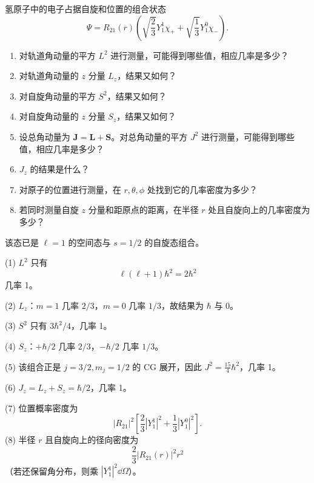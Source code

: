 \begin{question}
氢原子中的电子占据自旋和位置的组合状态
\[
\Psi=R_{21}(r)\left(\sqrt{\frac23}Y_1^1\chi_+ +\sqrt{\frac13}Y_1^0\chi_-\right).
\]
\begin{enumerate}
\item 对轨道角动量的平方 $L^2$ 进行测量，可能得到哪些值，相应几率是多少？
\item 对轨道角动量的 $z$ 分量 $L_z$，结果又如何？
\item 对自旋角动量的平方 $S^2$，结果又如何？
\item 对自旋角动量的 $z$ 分量 $S_z$，结果又如何？
\item 设总角动量为 $\mathbf J=\mathbf L+\mathbf S$。对总角动量的平方 $J^2$ 进行测量，可能得到哪些值，相应几率是多少？
\item $J_z$ 的结果是什么？
\item 对原子的位置进行测量，在 $r,\theta,\phi$ 处找到它的几率密度为多少？
\item 若同时测量自旋 $z$ 分量和距原点的距离，在半径 $r$ 处且自旋向上的几率密度为多少？
\end{enumerate}
\end{question}
\begin{solution}

该态已是 $\ell=1$ 的空间态与 $s=1/2$ 的自旋态组合。

(1) $L^2$ 只有
\[
\ell(\ell+1)
\hbar^2=2\hbar^2
\]
几率 1。

(2) $L_z$：$m=1$ 几率 $2/3$，$m=0$ 几率 $1/3$，故结果为 $\hbar$ 与 $0$。

(3) $S^2$ 只有 $3\hbar^2/4$，几率 1。

(4) $S_z$：$+\hbar/2$ 几率 $2/3$，$-\hbar/2$ 几率 $1/3$。

(5) 该组合正是 $j=3/2,m_j=1/2$ 的 CG 展开，因此 $J^2=\frac{15}{4}\hbar^2$，几率 1。

(6) $J_z=L_z+S_z=\hbar/2$，几率 1。

(7) 位置概率密度为
\[
|R_{21}|^2\left[\frac23|Y_1^1|^2+\frac13|Y_1^0|^2\right].
\]
(8) 半径 $r$ 且自旋向上的径向密度为
\[
\frac23 |R_{21}(r)|^2r^2
\]
（若还保留角分布，则乘 $|Y_1^1|^2\dd\Omega$）。

\end{solution}

